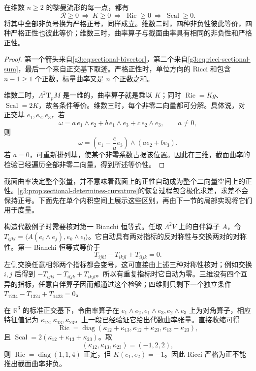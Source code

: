 \begin{proposition}
	\label{g3:prop:curvature-positivity-implications}
	在维数 \(n\geq2\) 的黎曼流形的每一点，都有
	\begin{equation}
		\label{g3:eq:curvature-positivity-chain}
		\mathcal R\geq0\ \Longrightarrow\ K\geq0
		\ \Longrightarrow\ \operatorname{Ric}\geq0
		\ \Longrightarrow\ \operatorname{Scal}\geq0.
	\end{equation}
	将其中全部非负号换为严格正号，同样成立。维数二时，四种非负性彼此等价，四种严格正性也彼此等价；维数三时，曲率算子与截面曲率具有相同的非负性和严格正性。
\end{proposition}
\begin{proof}
	第一个箭头来自\eqref{g3:eq:sectional-bivector}，第二个来自\eqref{g3:eq:ricci-sectional-sum}，最后一个来自正交基下取迹。严格正性时，单位方向的 Ricci 和包含 \(n-1\geq1\) 个正数，标量曲率又是 \(n\) 个正数之和。

	维数二时，\(\Lambda^2\mathrm{T}_pM\) 是一维的，曲率算子就是乘以 \(K\)；同时 \(\operatorname{Ric}=Kg\)、\(\operatorname{Scal}=2K\)，故各条件等价。维数三时，每个非零二向量都可分解。具体说，对正交基 \(e_1,e_2,e_3\)，若
	\[
		\omega=a\,e_1\wedge e_2+b\,e_1\wedge e_3+c\,e_2\wedge e_3,
		\qquad a\ne0,
	\]
	则
	\[
		\omega=\left(e_1-\frac ca e_3\right)\wedge(ae_2+be_3).
	\]
	若 \(a=0\)，可重新排列基，使某个非零系数占据该位置。因此在三维，截面曲率的检验已经遍历全部非零二向量，得到所述等价性。
\end{proof}

截面曲率决定整个张量，并不意味着截面上的正性自动成为整个二向量空间上的正性。\cref{g3:prop:sectional-determines-curvature}的恢复过程包含极化求差，求差不会保持正号。下面先在单个内积空间上展示这些区别，再由下一节的局部实现将它们用于度量。

\ProseParagraphBreak

构造代数例子时需要核对第一 Bianchi 恒等式。任取 \(\Lambda^2V\) 上的自伴算子 \(A\)，令 \(T_{ijkl}=\langle A(e_i\wedge e_j),e_k\wedge e_l\rangle\)。它自动具有两对指标的反对称性与交换两对的对称性。第一 Bianchi 恒等式等价于
\begin{equation}
	\label{g3:eq:operator-bianchi-test}
	T_{ijkl}-T_{ikjl}+T_{iljk}=0.
\end{equation}
左侧交换任意相邻两个指标都会变号，这可直接由上述三种对称性核对；例如交换 \(i,j\) 后得到 \(-T_{ijkl}-T_{iljk}+T_{ikjl}\)。所以有重复指标时它自动为零。三维没有四个互异的指标，任意自伴算子因而都通过这个检验；四维则只剩下一个独立条件 \(T_{1234}-T_{1324}+T_{1423}=0\)。

\begin{example}
	\label{g3:exm:ricci-positive-sectional-negative}
	在 \(\mathbb R^3\) 的标准正交基下，令曲率算子在 \(e_1\wedge e_2,e_1\wedge e_3,e_2\wedge e_3\) 上为对角算子，相应特征值记为 \(\kappa_{12},\kappa_{13},\kappa_{23}\)。上一段已经验证它给出代数曲率张量。直接收缩可得
	\[
		\operatorname{Ric}
		=\operatorname{diag}(\kappa_{12}+\kappa_{13},
		\kappa_{12}+\kappa_{23},\kappa_{13}+\kappa_{23}),
	\]
	且 \(\operatorname{Scal}=2(\kappa_{12}+\kappa_{13}+\kappa_{23})\)。取
	\[
		(\kappa_{12},\kappa_{13},\kappa_{23})=(-1,2,2),
	\]
	则 \(\operatorname{Ric}=\operatorname{diag}(1,1,4)\) 正定，但 \(K(e_1,e_2)=-1\)。因此 Ricci 严格为正不能推出截面曲率非负。
\end{example}

